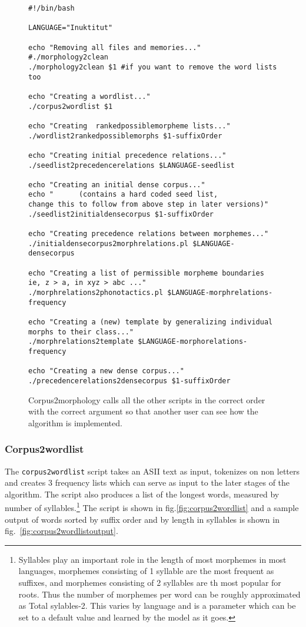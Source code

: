 \documentclass[runningheads,a4paper]{llncs}
\begin{document}
\begin{figure*}
	
\begin{verbatim}
#!/bin/bash

LANGUAGE="Inuktitut"

echo "Removing all files and memories..."
#./morphology2clean
./morphology2clean $1 #if you want to remove the word lists too

echo "Creating a wordlist..."
./corpus2wordlist $1

echo "Creating  rankedpossiblemorpheme lists..."
./wordlist2rankedpossiblemorphs $1-suffixOrder

echo "Creating initial precedence relations..."
./seedlist2precedencerelations $LANGUAGE-seedlist

echo "Creating an initial dense corpus..."
echo "      (contains a hard coded seed list, 
change this to follow from above step in later versions)"
./seedlist2initialdensecorpus $1-suffixOrder

echo "Creating precedence relations between morphemes..."
./initialdensecorpus2morphrelations.pl $LANGUAGE-densecorpus

echo "Creating a list of permissible morpheme boundaries ie, z > a, in xyz > abc ..."
./morphrelations2phonotactics.pl $LANGUAGE-morphrelations-frequency

echo "Creating a (new) template by generalizing individual morphs to their class..."
./morphrelations2template $LANGUAGE-morphorelations-frequency

echo "Creating a new dense corpus..."
./precedencerelations2densecorpus $1-suffixOrder
\end{verbatim}

	\caption{Corpus2morphology calls all the other scripts in the correct order with the correct argument so that another user can see how the algorithm is implemented.}
	\label{fig:corpus2morphology}
\end{figure*}

\subsubsection{Corpus2wordlist}

The {\tt corpus2wordlist} script takes an ASII text as input, tokenizes on non letters and creates 3 frequency lists which can serve as input to the later stages of the algorithm. The script also produces a list of the longest words, measured by number of syllables.\footnote{Syllables play an important role in the length of most morphemes in most languages, morphemes consisting of 1 syllable are the most frequent as suffixes, and morphemes consisting of 2 syllables are th most popular for roots. Thus the number of morphemes per word can be roughly approximated as Total sylables-2. This varies by language and is a parameter which can be set to a default value and learned by the model as it goes.} The script is shown in fig.\ref{fig:corpus2wordlist} and a sample output of words sorted by suffix order and by length in syllables is shown in fig.~\ref{fig:corpus2wordlistoutput}. 
\end{document}

